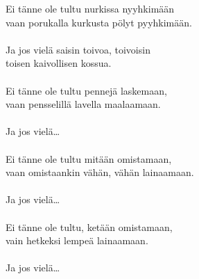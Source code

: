
            Ei tänne ole tultu nurkissa nyyhkimään \\
            vaan porukalla kurkusta pölyt pyyhkimään. \\
\hspace{10mm} \\
            Ja jos vielä saisin toivoa, toivoisin \\
            toisen kaivollisen kossua. \\
\hspace{10mm} \\
            Ei tänne ole tultu pennejä laskemaan, \\
            vaan pensselillä lavella maalaamaan. \\
\hspace{10mm} \\
            Ja jos vielä… \\
\hspace{10mm} \\
            Ei tänne ole tultu mitään omistamaan, \\
            vaan omistaankin vähän, vähän lainaamaan. \\
\hspace{10mm} \\
            Ja jos vielä… \\
\hspace{10mm} \\
            Ei tänne ole tultu, ketään omistamaan, \\
            vain hetkeksi lempeä lainaamaan. \\
\hspace{10mm} \\
            Ja jos vielä… \\
